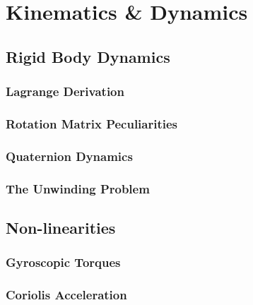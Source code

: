 \chapter{Kinematics \& Dynamics}
\label{ch:dynamics}
\section{Rigid Body Dynamics}
\label{sec:dynamics.rigidbody}
\subsection{Lagrange Derivation}
\label{subsec:dynamics.rigidbody.lagrange}
\subsection{Rotation Matrix Peculiarities}\label{subsec:dynamics.rigidbody.singularity}
\subsection{Quaternion Dynamics}
\label{subsec:dynamics.rigidbody.quaternion}
\subsection{The Unwinding Problem}
\label{subsec:dynamics.rigidbody.unwinding}

\section{Non-linearities}
\label{sec:dynamics.nonlinearities}
\subsection{Gyroscopic Torques}
\label{subsec:dynamics.nonlinearities.gyrotorques}
\subsection{Coriolis Acceleration}
\label{subsec:dynamics.nonlinearities.coriolis}
